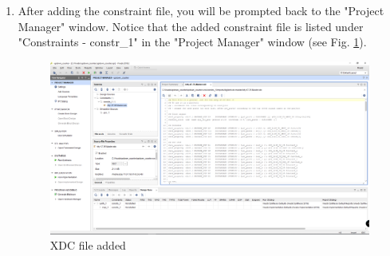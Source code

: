 \documentclass{article}
\begin{document}
\begin{enumerate}
    \item After adding the constraint file, you will be prompted back to the "Project Manager" window. Notice that the added constraint file is listed under
      "Constraints - constr\_1" in the "Project Manager" window (see Fig. \ref{fig:11-project_window_constraint_added}).
      \begin{figure}[h!]
        \centering
        \includegraphics[width=\linewidth]{img/program/11-project_window_constraint_added.png}
        \caption{XDC file added}
        \label{fig:11-project_window_constraint_added}
      \end{figure}
  \end{enumerate}

\newpage
\clearpage
\end{document}
